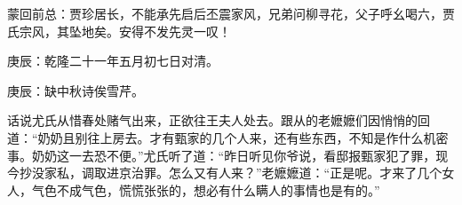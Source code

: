 

\begin{parag}
    \begin{note}蒙回前总：贾珍居长，不能承先启后丕震家风，兄弟问柳寻花，父子呼幺喝六，贾氏宗风，其坠地矣。安得不发先灵一叹！\end{note}
\end{parag}


\begin{parag}
    \begin{note}庚辰：乾隆二十一年五月初七日对清。\end{note}
\end{parag}


\begin{parag}
    \begin{note}庚辰：缺中秋诗俟雪芹。\end{note}
\end{parag}


\begin{parag}
    话说尤氏从惜春处赌气出来，正欲往王夫人处去。跟从的老嬷嬷们因悄悄的回道：“奶奶且别往上房去。才有甄家的几个人来，还有些东西，不知是作什么机密事。奶奶这一去恐不便。”尤氏听了道：“昨日听见你爷说，看邸报甄家犯了罪，现今抄没家私，调取进京治罪。怎么又有人来？”老嬷嬷道：“正是呢。才来了几个女人，气色不成气色，慌慌张张的，想必有什么瞒人的事情也是有的。”
\end{parag}


